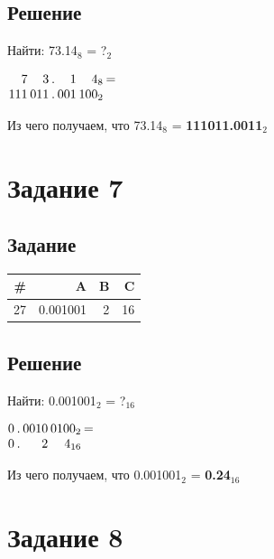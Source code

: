 \documentclass[11pt]{article}
\begin{document}
\subsection{Решение}
\label{sec:org6478504}
Найти: 73.14\(_{\text{8}}\) = ?\(_{\text{2}}\)
\begin{center}
\(\arraycolsep=0.05em
\begin{array}{rrrrcrrrrrr}
  7 &&   3 && . &&   1 &&   4_8 && = \\
111 && 011 && . && 001 && 100_2 \\
\end{array}\)
\end{center}

Из чего получаем, что 73.14\(_{\text{8}}\) = \textbf{111011.0011\(_{\text{2}}\)}

\section{Задание 7}
\label{sec:org026e668}
\subsection{Задание}
\label{sec:orgf81c565}
\begin{center}
\begin{tabular}{|r|rrr|}
\hline
\# & A & B & C\\
\hline
27 & 0.001001 & 2 & 16\\
\hline
\end{tabular}
\end{center}

\subsection{Решение}
\label{sec:org049573d}
Найти: 0.001001\(_{\text{2}}\) = ?\(_{\text{16}}\)
\begin{center}
\(\arraycolsep=0.05em
\begin{array}{rrcrrrrrr}
0 && . && 0010 && 0100_2 && = \\
0 && . &&    2 &&    4_{16} \\
\end{array}\)
\end{center}

Из чего получаем, что 0.001001\(_{\text{2}}\) = \textbf{0.24\(_{\text{16}}\)}

\section{Задание 8}
\label{sec:orge0781b8}
\end{document}
